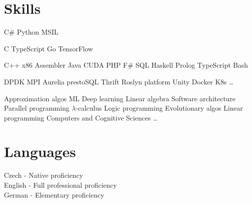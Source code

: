 \documentclass[a4paper]{deedy-resume} %
\begin{document}
\begin{minipage}[t]{0.33\textwidth}
\sectionspace %


\section{Skills}


C\# \textbullet{}  Python \textbullet{} MSIL \\ 
\halfsectionspace %

C \textbullet{} TypeScript \textbullet{} Go \textbullet{} TensorFlow \\
\halfsectionspace %

C++ \textbullet{} x86 Assembler \textbullet{} Java \textbullet{} CUDA \textbullet{} PHP \textbullet{} F\# \textbullet SQL \textbullet{} Haskell \textbullet{} Prolog \textbullet TypeScript \textbullet{} Bash \\

\sectionspace %

DPDK \textbullet{} MPI \textbullet{} Aurelia \textbullet{} prestoSQL \textbullet{} Thrift \textbullet{} Roslyn platform \textbullet{} Unity \textbullet{} Docker \textbullet{} K8s \textbullet{} \ldots \\

\sectionspace %


Approximation algos \textbullet{} ML \textbullet{} Deep learning \textbullet{} Linear algebra \textbullet{} Software architecture \textbullet{} Parallel programming \textbullet{} $\lambda$-calculus \textbullet{} Logic programming \textbullet{} Evolutionary algos \textbullet{} Linear programming \textbullet{} Computers and Cognitive Sciences \textbullet{} \ldots 

\sectionspace %

\section{Languages}

Czech - Native proficiency \\
English - Full professional proficiency \\
German - Elementary proficiency


\end{minipage}
\end{document}
